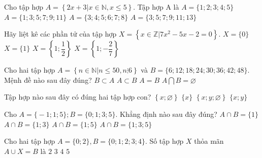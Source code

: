\begin{ex}%
	Cho tập hợp $A=\left\{ 2x+3|x \in \mathbb{N},x \leq 5 \right\}$. Tập hợp A là
	\choice
	{$A=\big\{1;2;3;4;5\big\}$}
	{$A=\big\{1;3;5;7;9;11\big\}$}
	{$A=\big\{3;4;5;6;7;8\big\}$}
	{\True $A=\big\{3;5;7;9;11;13\big\}$}
\end{ex}
\begin{ex}%
	Hãy liệt kê các phần tử của tập hợp $X=\left\{ x \in \mathbb{Z}|7x^2-5x-2=0 \right\}$.
	\choice
	{$X=\big\{0\big\}$}
	{\True $X=\big\{1\big\}$}
	{$X=\left\{ 1;\dfrac{1}{2} \right\}$}
	{$X=\left\{ 1;-\dfrac{2}{7} \right\}$}
\end{ex}
\begin{ex}%
	Cho hai tập hợp $A=\left\{ n \in \mathbb{N}\bigg|n \leq 50,n \vdots 6 \right\}$ và $B=\big\{6;12;18;24;30;36;42;48\big\}$. Mệnh đề nào sau đây đúng?
	\choice
	{\True $B \subset A$}
	{$A \subset B$}
	{$A=B$}
	{$A\bigcap B=\varnothing$}
\end{ex}
\begin{ex}%
	Tập hợp nào sau đây có đúng hai tập hợp con?
	\choice
	{$\left\{ x;\varnothing \right\}$}
	{\True $\big\{x\big\}$}
	{$\left\{ x;y;\varnothing \right\}$}
	{$\big\{x;y\big\}$}
\end{ex}
\begin{ex}%
	Cho $A=\big\{-1;1;5\big\};B=\big\{0;1;3;5\big\}$. Khẳng định nào sau đây đúng?
	\choice
	{$A \cap B=\big\{1\big\}$}
	{$A \cap B=\big\{1;3\big\}$}
	{\True $A \cap B=\big\{1;5\big\}$}
	{$A \cap B=\big\{1;3;5\big\}$}
\end{ex}
\begin{ex}%
	Cho hai tập hợp $A=\big\{0;2\big\},B=\big\{0;1;2;3;4\big\}$. Số tập hợp $X$ thỏa mãn $A \cup X=B$ là
	\choice
	{$2$}
	{$3$}
	{\True $4$}
	{$5$}
\end{ex}
